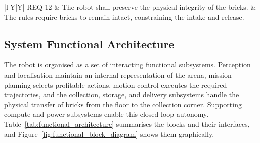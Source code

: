 \documentclass[11pt]{article}
\begin{document}
\begin{table}[H]
\begin{tabularx}{\linewidth}{|l|Y|Y|}
\hline
REQ-12 & The robot shall preserve the physical integrity of the bricks. & The rules require bricks to remain intact, constraining the intake and release. \\
\hline
\end{tabularx}
\caption{System requirements derived from the competition objectives and design constraints.}\label{tab:system_requirements}
\end{table}

\subsection{System Functional Architecture}
The robot is organised as a set of interacting functional subsystems. Perception and localisation maintain an internal representation of the arena, mission planning selects profitable actions, motion control executes the required trajectories, and the collection, storage, and delivery subsystems handle the physical transfer of bricks from the floor to the collection corner. Supporting compute and power subsystems enable this closed loop autonomy. Table~\ref{tab:functional_architecture} summarises the blocks and their interfaces, and Figure~\ref{fig:functional_block_diagram} shows them graphically.
\end{document}
